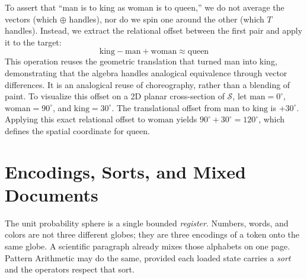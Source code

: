 \documentclass[12pt, a4paper]{article}
\begin{document}
To assert that ``man is to king as woman is to queen,'' we do not average the vectors (which $\oplus$ handles), nor do we spin one around the other (which $T$ handles). Instead, we extract the relational offset between the first pair and apply it to the target:
\begin{equation}
    \text{king} - \text{man} + \text{woman} \approx \text{queen}
    \label{eq:analogical_offset}
\end{equation}
This operation reuses the geometric translation that turned man into king, demonstrating that the algebra handles analogical equivalence through vector differences. It is an analogical reuse of choreography, rather than a blending of paint.
To visualize this offset on a 2D planar cross-section of $\mathcal{S}$, let $\text{man} = 0^\circ$, $\text{woman} = 90^\circ$, and $\text{king} = 30^\circ$. The translational offset from $\text{man}$ to $\text{king}$ is $+30^\circ$. Applying this exact relational offset to $\text{woman}$ yields $90^\circ + 30^\circ = 120^\circ$, which defines the spatial coordinate for $\text{queen}$.

\section{Encodings, Sorts, and Mixed Documents}
\label{sec:encodings_sorts}

The unit probability sphere is a single bounded \emph{register}.
Numbers, words, and colors are not three different globes; they are
three encodings of a token onto the same globe. A scientific paragraph
already mixes those alphabets on one page. Pattern Arithmetic may do
the same, provided each loaded state carries a \emph{sort} and the
operators respect that sort.
\end{document}
